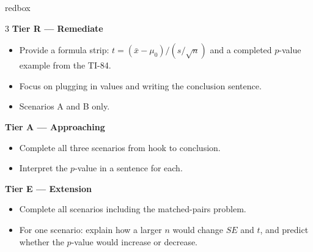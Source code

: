 \documentclass[10pt]{article}
\begin{document}
\begin{skillbox}{redbox}
\begin{multicols}{3}
    \textbf{Tier R --- Remediate}
    \begin{itemize}
        \item Provide a formula strip: $t = (\bar x - \mu_0)/(s/\sqrt{n})$ and a completed
              $p$-value example from the TI-84.
        \item Focus on plugging in values and writing the conclusion sentence.
        \item Scenarios A and B only.
    \end{itemize}
    \columnbreak
    \textbf{Tier A --- Approaching}
    \begin{itemize}
        \item Complete all three scenarios from hook to conclusion.
        \item Interpret the $p$-value in a sentence for each.
    \end{itemize}
    \columnbreak
    \textbf{Tier E --- Extension}
    \begin{itemize}
        \item Complete all scenarios including the matched-pairs problem.
        \item For one scenario: explain how a larger $n$ would change $SE$ and $t$,
              and predict whether the $p$-value would increase or decrease.
    \end{itemize}
\end{multicols}
\end{skillbox}
\end{document}
